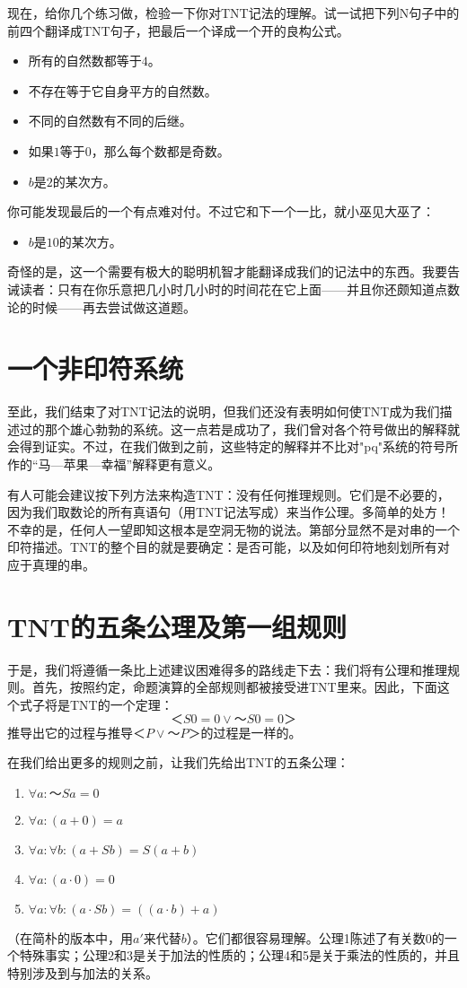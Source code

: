 现在，给你几个练习做，检验一下你对TNT记法的理解。试一试把下列N句子中的前四个翻译成TNT句子，把最后一个译成一个开的良构公式。
\begin{itemize}
\item 所有的自然数都等于$4$。
\item 不存在等于它自身平方的自然数。
\item 不同的自然数有不同的后继。
\item 如果$1$等于$0$，那么每个数都是奇数。
\item $b$是$2$的某次方。
\end{itemize}
你可能发现最后的一个有点难对付。不过它和下一个一比，就小巫见大巫了：
\begin{itemize}
\item $b$是$10$的某次方。
\end{itemize}

奇怪的是，这一个需要有极大的聪明机智才能翻译成我们的记法中的东西。我要告诫读者：只有在你乐意把几小时几小时的时间花在它上面——并且你还颇知道点数论的时候——再去尝试做这道题。

\section{一个非印符系统}

至此，我们结束了对TNT记法的说明，但我们还没有表明如何使TNT成为我们描述过的那个雄心勃勃的系统。这一点若是成功了，我们曾对各个符号做出的解释就会得到证实。不过，在我们做到之前，这些特定的解释并不比对"pq"系统的符号所作的“马—苹果—幸福”解释更有意义。

有人可能会建议按下列方法来构造TNT：没有任何推理规则。它们是不必要的，因为我们取数论的所有真语句（用TNT记法写成）来当作公理。多简单的处方！不幸的是，任何人一望即知这根本是空洞无物的说法。第部分显然不是对串的一个印符描述。TNT的整个目的就是要确定：是否可能，以及如何印符地刻划所有对应于真理的串。

\section{TNT的五条公理及第一组规则}

于是，我们将遵循一条比上述建议困难得多的路线走下去：我们将有公理和推理规则。首先，按照约定，命题演算的全部规则都被接受进TNT里来。因此，下面这个式子将是TNT的一个定理：
\[
＜S0=0∨～S0=0＞
\]
推导出它的过程与推导$＜P∨～P＞$的过程是一样的。

在我们给出更多的规则之前，让我们先给出TNT的五条公理：
\begin{enumerate}[label=公理\arabic*, format=\em, itemsep=\smallskipamount]
\item $\forall a:～Sa=0$
\item $\forall a:(a+0)=a$
\item $\forall a:\forall b:(a+Sb)=S(a+b)$
\item $\forall a:(a\cdot 0)=0$
\item $\forall a:\forall b:(a\cdot Sb)=((a\cdot b)+a)$
\end{enumerate}
（在简朴的版本中，用$a'$来代替$b$）。它们都很容易理解。公理1陈述了有关数$0$的一个特殊事实；公理2和3是关于加法的性质的；公理4和5是关于乘法的性质的，并且特别涉及到与加法的关系。

